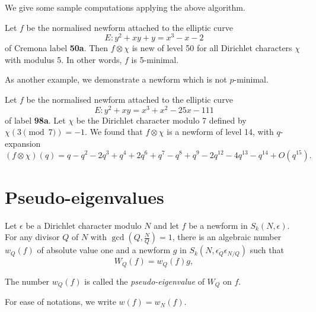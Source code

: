 \documentclass [11pt, proquest] {uwthesis}[2015/03/03]
\begin{document}


We give some sample computations applying the above algorithm. 

\begin{Example}
Let $f$ be the normalised newform attached to the elliptic curve 
\[
	E: y^2 + x y + y = x^{3} -  x - 2
\]
of Cremona label {\bf 50a}. Then $f \otimes \chi$ is new of level 50 for all Dirichlet characters $\chi$ with modulus 5. 
In other words, $f$ is 5-minimal. 
\end{Example}

As another example, we demonstrate a newform which is not $p$-minimal. 
\begin{Example}
Let $f$ be the normalised newform attached to the elliptic curve 
\[
E: y^2 + x y = x^{3} + x^{2} - 25 x - 111
\]
of label {\bf 98a}. Let $\chi$ be the Dirichlet character modulo 7 defined by $\chi(3 \pmod{7}) = -1$. 
We found that $f \otimes \chi$ is a newform of level 14, with $q$-expansion
\[
 (f \otimes \chi) (q) = q - q^{2} - 2q^{3} + q^{4} + 2q^{6} + q^{7} - q^{8} + q^{9} - 2q^{12} - 4q^{13} - q^{14} + O(q^{15}).
\]
\end{Example}


\section{Pseudo-eigenvalues} 

Let $\epsilon$ be a Dirichlet character modulo $N$ and let $f$ be a newform in $S_k(N,\epsilon)$. For any divisor $Q$ of $N$ with $\gcd(Q, \frac{N}{Q}) =1$, there is an algebraic number  $w_Q(f)$ of absolute value one  and  a newform $g$ in $S_k(N, \overline{\epsilon_Q} \epsilon_{N/Q})$ such that 
\[
	W_Q(f) = w_Q(f) g, 
\]


\begin{Definition}
The number $w_Q(f)$ is called the {\it pseudo-eigenvalue} of $W_Q$ on $f$. 
\end{Definition}
For ease of notations, we write $w(f) = w_N(f)$. 
\end{document}
